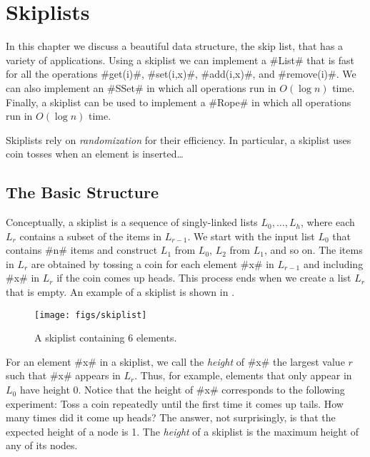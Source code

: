 \chapter{Skiplists}


In this chapter we discuss a beautiful data structure, the skip list,
that has a variety of applications.  Using a skiplist we can implement
a #List# that is fast for all the operations #get(i)#, #set(i,x)#,
#add(i,x)#, and #remove(i)#. We can also implement an #SSet# in which
all operations run in $O(\log n)$ time.  Finally, a skiplist can be used
to implement a #Rope# in which all operations run in $O(\log n)$ time.

Skiplists rely on \emph{randomization} for their efficiency.  In
particular, a skiplist uses coin tosses when an element is inserted\ldots

\section{The Basic Structure}

Conceptually, a skiplist is a sequence of singly-linked lists
$L_0,\ldots,L_h$, where each $L_r$ contains a subset of the items
in $L_{r-1}$.  We start with the input list $L_0$ that contains #n#
items and construct $L_1$ from $L_0$, $L_2$ from $L_1$, and so on.
The items in $L_r$ are obtained by tossing a coin for each element #x#
in $L_{r-1}$ and including #x# in $L_r$ if the coin comes up heads.
This process ends when we create a list $L_r$ that is empty.  An example
of a skiplist is shown in .

\begin{figure}
  \begin{center}
    \texttt{[image: figs/skiplist]}
  \end{center}
  \caption{A skiplist containing 6 elements.}
\end{figure}

For an element #x# in a skiplist, we call the \emph{height} of #x# the
largest value $r$ such that #x# appears in $L_r$.  Thus, for example,
elements that only appear in $L_0$ have height $0$.  Notice that the
height of #x# corresponds to the following experiment:  Toss a coin
repeatedly until the first time it comes up tails.  How many times did
it come up heads?  The answer, not surprisingly, is that the expected
height of a node is 1.  The \emph{height} of a skiplist is the maximum
height of any of its nodes.

